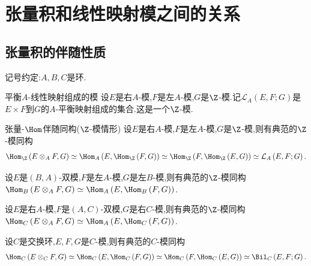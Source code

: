 \chapter{张量积和线性映射模之间的关系}

\section{张量积的伴随性质}

记号约定:$A,B,C$是环.

\begin{definition}{平衡$A$-线性映射组成的模}{}
	设$E$是右$A$-模,$F$是左$A$-模,$G$是$\Z$-模.记$\mathcal{L}_{A}\left(E,F;G\right)$是$E\times F$到$G$的$A$-平衡映射组成的集合.这是一个$\Z$-模.
\end{definition}

\begin{proposition}{张量-$\Hom$伴随同构($\Z$-模情形)}{}
	设$E$是右$A$-模,$F$是左$A$-模,$G$是$\Z$-模,则有典范的$\Z$-模同构
	\begin{align*}
		\Hom_{\Z}\left(E\otimes_{A}F,G\right)\simeq\Hom_{A}\left(E,\Hom_{\Z}\left(F,G\right)\right)\simeq\Hom_{\Z}\left(F,\Hom_{\Z}\left(E,G\right)\right)\simeq\mathcal{L}_{A}\left(E,F;G\right).
	\end{align*}
\end{proposition}

\begin{proposition}{}{}
	设$E$是$\left(B,A\right)$-双模,$F$是左$A$-模,$G$是左$B$-模,则有典范的$\Z$-模同构$\Hom_{B}\left(E\otimes_{A}F,G\right)\simeq\Hom_{A}\left(E,\Hom_{B}\left(F,G\right)\right)$.
\end{proposition}

\begin{proposition}{}{}
	设$E$是右$A$-模,$F$是$\left(A,C\right)$-双模,$G$是右$C$-模,则有典范的$\Z$-模同构$\Hom_{C}\left(E\otimes_{A}F,G\right)\simeq\Hom_{A}\left(E,\Hom_{C}\left(F,G\right)\right)$.
\end{proposition}

\begin{proposition}{}{}
	设$C$是交换环,$E,F,G$是$C$-模,则有典范的$C$-模同构
	\begin{align*}
		\Hom_{C}\left(E\otimes_{C}F,G\right)\simeq\Hom_{C}\left(E,\Hom_{C}\left(F,G\right)\right)\simeq\Hom_{C}\left(F,\Hom_{C}\left(E,G\right)\right)\simeq\Bil_{C}\left(E,F;G\right).
	\end{align*}
\end{proposition}